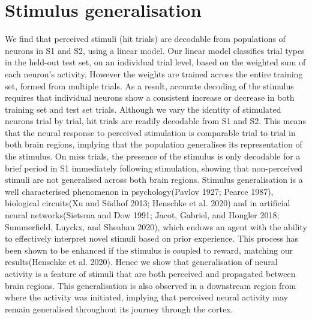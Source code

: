 \section{Stimulus generalisation}
We find that perceived stimuli (hit trials) are decodable from populations of neurons in S1 and S2, using a linear model. Our linear model classifies trial types in the held-out test set, on an individual trial level, based on the weighted sum of each neuron’s activity. However the weights are trained across the entire training set, formed from multiple trials. As a result, accurate decoding of the stimulus requires that individual neurons show a consistent increase or decrease in both training set and test set trials. Although we vary the identity of stimulated neurons trial by trial, hit trials are readily decodable from S1 and S2. This means that the neural response to perceived stimulation is comparable trial to trial in both brain regions, implying that the population generalises its representation of the stimulus. On miss trials, the presence of the stimulus is only decodable for a brief period in S1 immediately following stimulation, showing that non-perceived stimuli are not generalised across both brain regions. Stimulus generalisation is a well characterised phenomenon in psychology(Pavlov 1927; Pearce 1987), biological circuits(Xu and Südhof 2013; Henschke et al. 2020) and in artificial neural networks(Sietsma and Dow 1991; Jacot, Gabriel, and Hongler 2018; Summerfield, Luyckx, and Sheahan 2020), which endows an agent with the ability to effectively interpret novel stimuli based on prior experience. This process has been shown to be enhanced if the stimulus is coupled to reward, matching our results(Henschke et al. 2020). Hence we show that generalisation of neural activity is a feature of stimuli that are both perceived and propagated between brain regions. This generalisation is also observed in a downstream region from where the activity was initiated, implying that perceived neural activity may remain generalised throughout its journey through the cortex.

